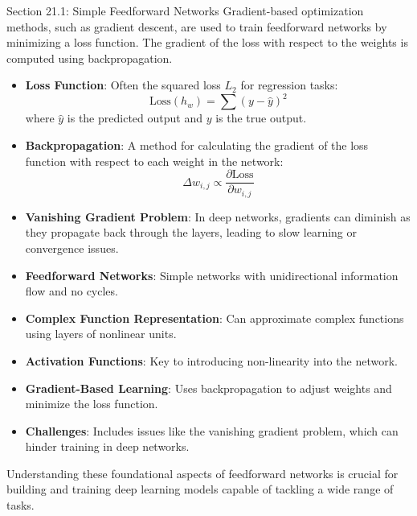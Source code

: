 \begin{notes}{Section 21.1: Simple Feedforward Networks}
    Gradient-based optimization methods, such as gradient descent, are used to train feedforward networks by minimizing a loss function. The gradient of the loss with respect to the weights is computed 
    using backpropagation.
    
    \begin{highlight}
    
        \begin{itemize}
            \item \textbf{Loss Function}: Often the squared loss $L_2$ for regression tasks:
            \[
            \text{Loss}(h_w) = \sum (y - \hat{y})^2
            \]
            where $\hat{y}$ is the predicted output and $y$ is the true output.
            \item \textbf{Backpropagation}: A method for calculating the gradient of the loss function with respect to each weight in the network:
            \[
            \Delta w_{i,j} \propto \frac{\partial \text{Loss}}{\partial w_{i,j}}
            \]
            \item \textbf{Vanishing Gradient Problem}: In deep networks, gradients can diminish as they propagate back through the layers, leading to slow learning or convergence issues.
        \end{itemize}
    
    \end{highlight}
    
    \begin{highlight}
    
        \begin{itemize}
            \item \textbf{Feedforward Networks}: Simple networks with unidirectional information flow and no cycles.
            \item \textbf{Complex Function Representation}: Can approximate complex functions using layers of nonlinear units.
            \item \textbf{Activation Functions}: Key to introducing non-linearity into the network.
            \item \textbf{Gradient-Based Learning}: Uses backpropagation to adjust weights and minimize the loss function.
            \item \textbf{Challenges}: Includes issues like the vanishing gradient problem, which can hinder training in deep networks.
        \end{itemize}
    
        Understanding these foundational aspects of feedforward networks is crucial for building and training deep learning models capable of tackling a wide range of tasks.
    
    \end{highlight}
\end{notes}

